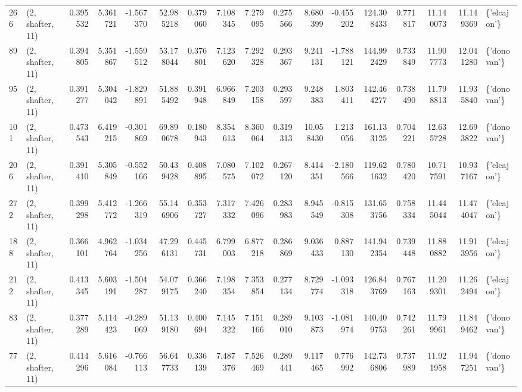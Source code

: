 \begin{tabular}{llrrrrrrrrrrrrrrl}
266 &  (2, shafter, 11) &   0.395532 &   5.361721 &  -1.567370 &    52.985218 &   0.379060 &   7.108345 &   7.279095 &  0.275566 &   8.680399 &  -0.455202 &   124.308433 &   0.771817 &  11.140073 &  11.149369 &  \{'elcajon'\} \\
89  &  (2, shafter, 11) &   0.394805 &   5.351867 &  -1.559512 &    53.178044 &   0.376801 &   7.123620 &   7.292328 &  0.293367 &   9.241131 &  -1.788121 &   144.992429 &   0.733849 &  11.907773 &  12.041280 &  \{'donovan'\} \\
95  &  (2, shafter, 11) &   0.391277 &   5.304042 &  -1.829891 &    51.885492 &   0.391948 &   6.966849 &   7.203158 &  0.293597 &   9.248383 &   1.803411 &   142.464277 &   0.738490 &  11.798813 &  11.935840 &  \{'donovan'\} \\
101 &  (2, shafter, 11) &   0.473543 &   6.419215 &  -0.301869 &    69.890678 &   0.180943 &   8.354613 &   8.360064 &  0.319313 &  10.058430 &   1.213056 &   161.133125 &   0.704221 &  12.635728 &  12.693822 &  \{'donovan'\} \\
206 &  (2, shafter, 11) &   0.391410 &   5.305849 &  -0.552166 &    50.439428 &   0.408895 &   7.080575 &   7.102072 &  0.267120 &   8.414351 &  -2.180566 &   119.621632 &   0.780420 &  10.717591 &  10.937167 &  \{'elcajon'\} \\
272 &  (2, shafter, 11) &   0.399298 &   5.412772 &  -1.266319 &    55.146906 &   0.353727 &   7.317332 &   7.426096 &  0.283983 &   8.945549 &  -0.815308 &   131.653756 &   0.758334 &  11.445044 &  11.474047 &  \{'elcajon'\} \\
188 &  (2, shafter, 11) &   0.366101 &   4.962764 &  -1.034256 &    47.296131 &   0.445731 &   6.799003 &   6.877218 &  0.286869 &   9.036433 &   0.887130 &   141.942354 &   0.739448 &  11.880882 &  11.913956 &  \{'elcajon'\} \\
212 &  (2, shafter, 11) &   0.413345 &   5.603191 &  -1.504287 &    54.079175 &   0.366240 &   7.198354 &   7.353854 &  0.277134 &   8.729774 &  -1.093318 &   126.843769 &   0.767163 &  11.209301 &  11.262494 &  \{'elcajon'\} \\
83  &  (2, shafter, 11) &   0.377289 &   5.114423 &  -0.289069 &    51.139180 &   0.400694 &   7.145322 &   7.151166 &  0.289010 &   9.103873 &  -1.081974 &   140.409753 &   0.742261 &  11.799961 &  11.849462 &  \{'donovan'\} \\
77  &  (2, shafter, 11) &   0.414296 &   5.616084 &  -0.766113 &    56.647733 &   0.336139 &   7.487376 &   7.526469 &  0.289441 &   9.117465 &   0.776992 &   142.736806 &   0.737989 &  11.921958 &  11.947251 &  \{'donovan'\} \\

\end{tabular}
